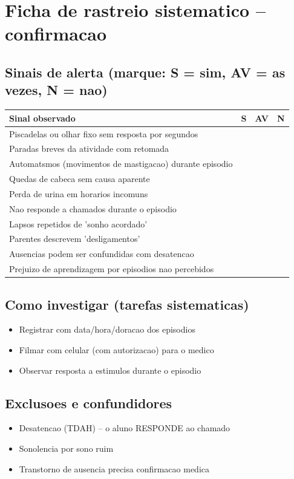 \documentclass[a4paper,11pt]{book}
\begin{document}
\section*{Ficha de rastreio sistematico -- confirmacao}
\subsection*{Sinais de alerta (marque: S = sim, AV = as vezes, N = nao)}
\begin{tabular}{@{}p{11.5cm}ccc@{}}\toprule
Sinal observado & S & AV & N \\\midrule
Piscadelas ou olhar fixo sem resposta por segundos & & & \\
Paradas breves da atividade com retomada & & & \\
Automatsmos (movimentos de mastigacao) durante episodio & & & \\
Quedas de cabeca sem causa aparente & & & \\
Perda de urina em horarios incomuns & & & \\
Nao responde a chamados durante o episodio & & & \\
Lapsos repetidos de 'sonho acordado' & & & \\
Parentes descrevem 'desligamentos' & & & \\
Ausencias podem ser confundidas com desatencao & & & \\
Prejuizo de aprendizagem por episodios nao percebidos & & & \\
\bottomrule\end{tabular}
\subsection*{Como investigar (tarefas sistematicas)}
\begin{itemize}
\item Registrar com data/hora/doracao dos episodios
\item Filmar com celular (com autorizacao) para o medico
\item Observar resposta a estimulos durante o episodio
\end{itemize}
\subsection*{Exclusoes e confundidores}
\begin{itemize}
\item Desatencao (TDAH) -- o aluno RESPONDE ao chamado
\item Sonolencia por sono ruim
\item Transtorno de ausencia precisa confirmacao medica
\end{itemize}
\end{document}
